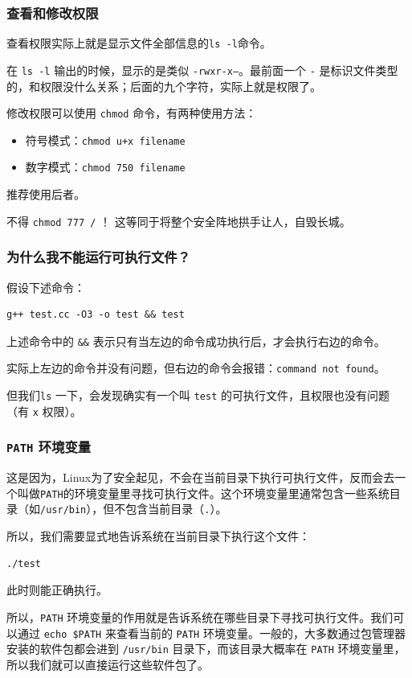 \documentclass{ctexbeamer}
\begin{document}
\begin{frame}
    \frametitle{查看和修改权限}

    查看权限实际上就是显示文件全部信息的\texttt{ls -l}命令。

    在 \texttt{ls -l} 输出的时候，显示的是类似 \texttt{-rwxr-x---}。最前面一个 \texttt{-} 是标识文件类型的，和权限没什么关系；后面的九个字符，实际上就是权限了。

    \hspace{2em}

    修改权限可以使用 \texttt{chmod} 命令，有两种使用方法：
    \begin{itemize}
        \item 符号模式：\texttt{chmod u+x filename}
        \item 数字模式：\texttt{chmod 750 filename}
    \end{itemize}
    推荐使用后者。

    \hspace{2em}

    \alert{不得 \texttt{chmod 777 /} ！} 这等同于将整个安全阵地拱手让人，自毁长城。

\end{frame}

\begin{frame}[fragile]
    \frametitle{为什么我不能运行可执行文件？}

    假设下述命令：
\begin{verbatim}
g++ test.cc -O3 -o test && test
\end{verbatim}
    上述命令中的 \texttt{\&\&} 表示只有当左边的命令成功执行后，才会执行右边的命令。

    实际上左边的命令并没有问题，但右边的命令会报错：\texttt{command not found}。

    但我们\texttt{ls} 一下，会发现确实有一个叫 \texttt{test} 的可执行文件，且权限也没有问题（有 \texttt{x} 权限）。



\end{frame}

\begin{frame}[fragile]
    \frametitle{\texttt{PATH} 环境变量}

    这是因为，Linux为了安全起见，不会在当前目录下执行可执行文件，反而会去一个叫做\texttt{PATH}的环境变量里寻找可执行文件。这个环境变量里通常包含一些系统目录（如\texttt{/usr/bin}），但不包含当前目录（\texttt{.}）。

    所以，我们需要显式地告诉系统在当前目录下执行这个文件：
\begin{verbatim}
./test
\end{verbatim}
    此时则能正确执行。

    所以，\texttt{PATH} 环境变量的作用就是告诉系统在哪些目录下寻找可执行文件。我们可以通过 \texttt{echo \$PATH} 来查看当前的 \texttt{PATH} 环境变量。一般的，大多数通过包管理器安装的软件包都会进到 \texttt{/usr/bin} 目录下，而该目录大概率在 \texttt{PATH} 环境变量里，所以我们就可以直接运行这些软件包了。

\end{frame}
\end{document}
